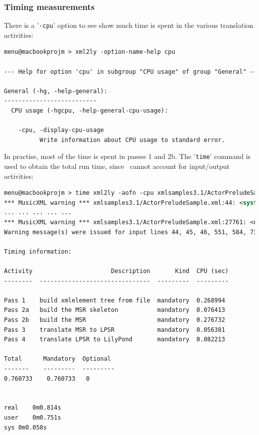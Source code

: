 \documentclass[12pt,a4paper]{article}
\begin{document}
\subsubsection{Timing measurements}

There is a '{\tt -cpu}' option to see show much time is spent in the various translation activities:
\begin{lstlisting}[language=XML]
menu@macbookprojm > xml2ly -option-name-help cpu  

--- Help for option 'cpu' in subgroup "CPU usage" of group "General" ---

General (-hg, -help-general):
--------------------------
  CPU usage (-hgcpu, -help-general-cpu-usage):
  
    -cpu, -display-cpu-usage
          Write information about CPU usage to standard error.
\end{lstlisting}

In practise, most of the time is spent in passes 1 and 2b. The '{\tt time}' command is used to obtain the total run time, since \xmlToLy\ cannot account for input/output activities:
\begin{lstlisting}[language=XML]
menu@macbookprojm > time xml2ly -aofn -cpu xmlsamples3.1/ActorPreludeSample.xml 
*** MusicXML warning *** xmlsamples3.1/ActorPreludeSample.xml:44: <system-distance /> is not supported yet by xml2ly
... ... ... ... ...
*** MusicXML warning *** xmlsamples3.1/ActorPreludeSample.xml:27761: <direction/> contains 2 <words/> markups
Warning message(s) were issued for input lines 44, 45, 46, 551, 584, 732, 1121, 1215, 4724, 27761

Timing information:

Activity                      Description       Kind  CPU (sec)
--------  -------------------------------  ---------  ---------

Pass 1    build xmlelement tree from file  mandatory  0.268994
Pass 2a   build the MSR skeleton           mandatory  0.076413
Pass 2b   build the MSR                    mandatory  0.276732
Pass 3    translate MSR to LPSR            mandatory  0.056381
Pass 4    translate LPSR to LilyPond       mandatory  0.082213

Total      Mandatory  Optional  
-------    ---------  ---------
0.760733    0.760733   0         


real	0m0.814s
user	0m0.751s
sys	0m0.058s
\end{lstlisting}
\end{document}
